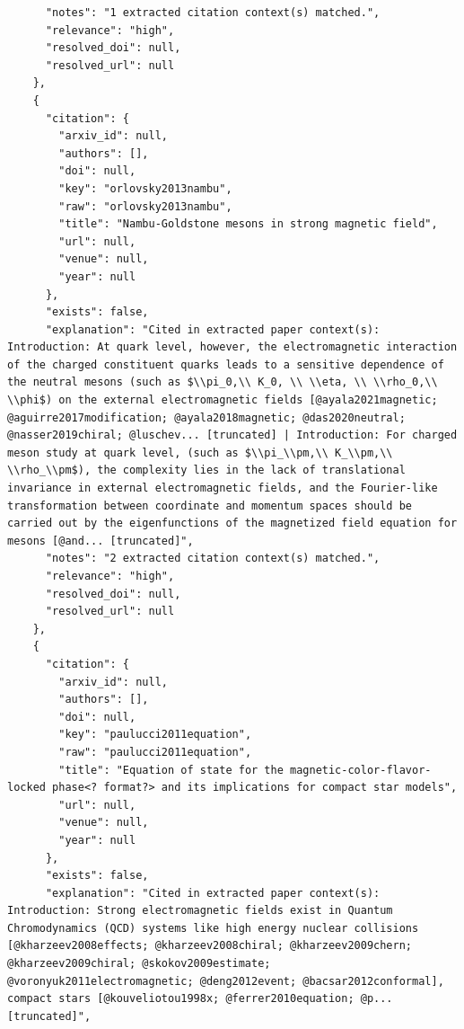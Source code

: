 \documentclass[11pt]{article}
\begin{document}
\begin{verbatim}
      "notes": "1 extracted citation context(s) matched.",
      "relevance": "high",
      "resolved_doi": null,
      "resolved_url": null
    },
    {
      "citation": {
        "arxiv_id": null,
        "authors": [],
        "doi": null,
        "key": "orlovsky2013nambu",
        "raw": "orlovsky2013nambu",
        "title": "Nambu-Goldstone mesons in strong magnetic field",
        "url": null,
        "venue": null,
        "year": null
      },
      "exists": false,
      "explanation": "Cited in extracted paper context(s): Introduction: At quark level, however, the electromagnetic interaction of the charged constituent quarks leads to a sensitive dependence of the neutral mesons (such as $\\pi_0,\\ K_0, \\ \\eta, \\ \\rho_0,\\ \\phi$) on the external electromagnetic fields [@ayala2021magnetic; @aguirre2017modification; @ayala2018magnetic; @das2020neutral; @nasser2019chiral; @luschev... [truncated] | Introduction: For charged meson study at quark level, (such as $\\pi_\\pm,\\ K_\\pm,\\ \\rho_\\pm$), the complexity lies in the lack of translational invariance in external electromagnetic fields, and the Fourier-like transformation between coordinate and momentum spaces should be carried out by the eigenfunctions of the magnetized field equation for mesons [@and... [truncated]",
      "notes": "2 extracted citation context(s) matched.",
      "relevance": "high",
      "resolved_doi": null,
      "resolved_url": null
    },
    {
      "citation": {
        "arxiv_id": null,
        "authors": [],
        "doi": null,
        "key": "paulucci2011equation",
        "raw": "paulucci2011equation",
        "title": "Equation of state for the magnetic-color-flavor-locked phase<? format?> and its implications for compact star models",
        "url": null,
        "venue": null,
        "year": null
      },
      "exists": false,
      "explanation": "Cited in extracted paper context(s): Introduction: Strong electromagnetic fields exist in Quantum Chromodynamics (QCD) systems like high energy nuclear collisions [@kharzeev2008effects; @kharzeev2008chiral; @kharzeev2009chern; @kharzeev2009chiral; @skokov2009estimate; @voronyuk2011electromagnetic; @deng2012event; @bacsar2012conformal], compact stars [@kouveliotou1998x; @ferrer2010equation; @p... [truncated]",

\end{verbatim}
\end{document}
